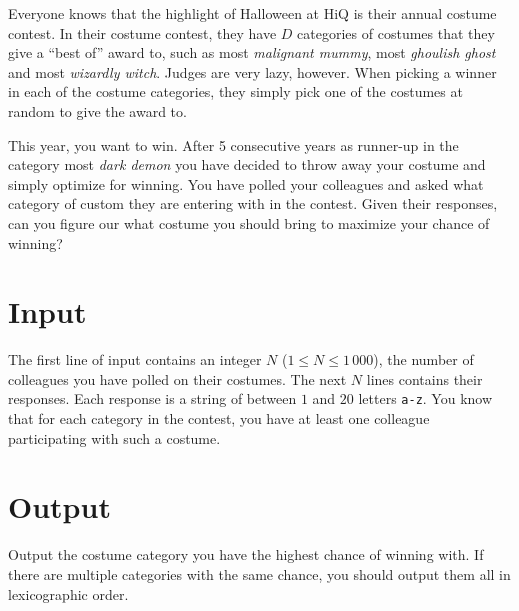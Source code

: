 Everyone knows that the highlight of Halloween at HiQ is their annual costume contest.
In their costume contest, they have $D$ categories of costumes that they give a ``best of'' award to, such as most \emph{malignant mummy}, most \emph{ghoulish ghost} and most \emph{wizardly witch}.
Judges are very lazy, however.
When picking a winner in each of the costume categories, they simply pick one of the costumes at random to give the award to.

This year, you want to win.
After 5 consecutive years as runner-up in the category most \emph{dark demon} you have decided to throw away your costume and simply optimize for winning.
You have polled your colleagues and asked what category of custom they are entering with in the contest.
Given their responses, can you figure our what costume you should bring to maximize your chance of winning?

\section*{Input}
The first line of input contains an integer $N$ ($1 \le N \le 1\,000$), the number of colleagues you have polled on their costumes.
The next $N$ lines contains their responses.
Each response is a string of between $1$ and $20$ letters \texttt{a-z}.
You know that for each category in the contest, you have at least one colleague participating with such a costume.

\section*{Output}
Output the costume category you have the highest chance of winning with.
If there are multiple categories with the same chance, you should output them all in lexicographic order.
